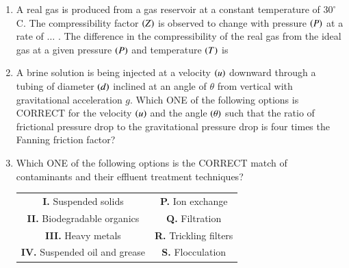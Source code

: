 \documentclass[journal,12pt,onecolumn]{IEEEtran}
\theoremstyle{remark}
\begin{document}
\begin{enumerate}
\hfill{}

\item A real gas is produced from a gas reservoir at a constant temperature of $30^\circ$C. The compressibility factor $\left(Z\right)$ is observed to change with pressure $\left(P\right)$ at a rate of $\dots$ . The difference in the compressibility of the real gas from the ideal gas at a given pressure $\left(P\right)$ and temperature $\left(T\right)$ is

\hfill{}

\begin{enumerate}
\end{enumerate}

\pagebreak

\item A brine solution is being injected at a velocity $\left(u\right)$ downward through a tubing of diameter $\left(d\right)$ inclined at an angle of $\theta$ from vertical with gravitational acceleration $g$. Which ONE of the following options is CORRECT for the velocity $\left(u\right)$ and the angle $\left(\theta\right)$ such that the ratio of frictional pressure drop to the gravitational pressure drop is four times the Fanning friction factor?

\hfill{}

\begin{enumerate}
\end{enumerate}

\item Which ONE of the following options is the CORRECT match of contaminants and their effluent treatment techniques?

\begin{tabular}{|c|c|}
\hline
\textbf{I.} Suspended solids & \textbf{P.} Ion exchange \\
\textbf{II.} Biodegradable organics & \textbf{Q.} Filtration \\
\textbf{III.} Heavy metals & \textbf{R.} Trickling filters \\
\textbf{IV.} Suspended oil and grease & \textbf{S.} Flocculation \\
\hline
\end{tabular}


\end{enumerate}
\end{document}
